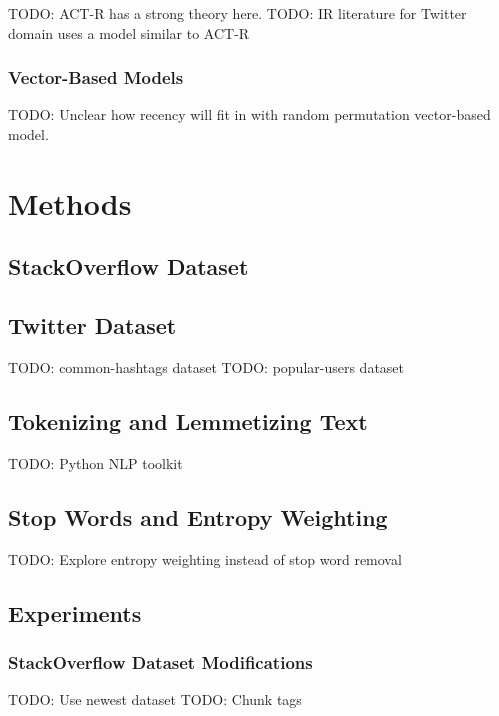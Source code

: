 \documentclass[man]{apa6}
\begin{document}
TODO: ACT-R has a strong theory here.
TODO: IR literature for Twitter domain uses a model similar to ACT-R \cite{Efron2011}

\subsubsection{Vector-Based Models}

TODO: Unclear how recency will fit in with random permutation vector-based model.

\section{Methods}

\subsection{StackOverflow Dataset}

\cite{DataDump2013}

\subsection{Twitter Dataset}

TODO: common-hashtags dataset
TODO: popular-users dataset

\subsection{Tokenizing and Lemmetizing Text}

TODO: Python NLP toolkit \cite{Bird2009}

\subsection{Stop Words and Entropy Weighting}

TODO: Explore entropy weighting instead of stop word removal \cite{Dumais1991}

\subsection{Experiments}

\subsubsection{StackOverflow Dataset Modifications}

TODO: Use newest dataset
TODO: Chunk tags
\end{document}
